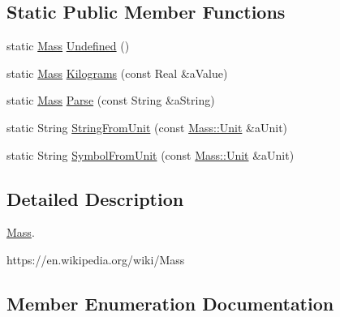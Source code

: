 \subsection*{Static Public Member Functions}
\begin{DoxyCompactItemize}
\item 
static \hyperlink{classlibrary_1_1physics_1_1units_1_1_mass}{Mass} \hyperlink{classlibrary_1_1physics_1_1units_1_1_mass_af3acc8762e8791a218e877595e94090b}{Undefined} ()
\item 
static \hyperlink{classlibrary_1_1physics_1_1units_1_1_mass}{Mass} \hyperlink{classlibrary_1_1physics_1_1units_1_1_mass_a6c334d95b07234aa10002529dff99f2c}{Kilograms} (const Real \&a\+Value)
\item 
static \hyperlink{classlibrary_1_1physics_1_1units_1_1_mass}{Mass} \hyperlink{classlibrary_1_1physics_1_1units_1_1_mass_a632ee29b61e4008ddafbc62664dc72c4}{Parse} (const String \&a\+String)
\item 
static String \hyperlink{classlibrary_1_1physics_1_1units_1_1_mass_ab2abb07bd20ab0a435b49b494f4ceb3f}{String\+From\+Unit} (const \hyperlink{classlibrary_1_1physics_1_1units_1_1_mass_a95f1e0434bc16794926b8e273bc2a54b}{Mass\+::\+Unit} \&a\+Unit)
\item 
static String \hyperlink{classlibrary_1_1physics_1_1units_1_1_mass_ad61ae35ac949926191b2517e674467a3}{Symbol\+From\+Unit} (const \hyperlink{classlibrary_1_1physics_1_1units_1_1_mass_a95f1e0434bc16794926b8e273bc2a54b}{Mass\+::\+Unit} \&a\+Unit)
\end{DoxyCompactItemize}


\subsection{Detailed Description}
\hyperlink{classlibrary_1_1physics_1_1units_1_1_mass}{Mass}. 

https\+://en.wikipedia.\+org/wiki/\+Mass 

\subsection{Member Enumeration Documentation}
\mbox{\label{classlibrary_1_1physics_1_1units_1_1_mass_a95f1e0434bc16794926b8e273bc2a54b}} 
